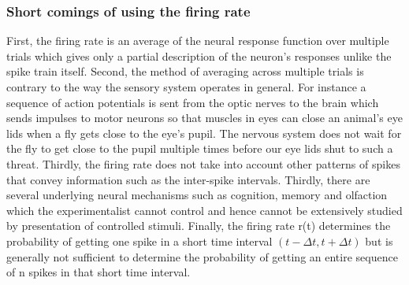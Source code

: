 \subsubsection{Short comings of using the firing rate}
First, the firing rate is an average of the neural response function over
multiple trials which gives only a partial description of the neuron's responses
unlike the spike train itself.
Second, the method of averaging across multiple trials is contrary to the way
the sensory system operates in general.
For instance a sequence of action potentials is sent from the optic nerves
to the brain which sends impulses to motor neurons so that muscles in eyes can close an animal's eye lids when a fly gets close to the eye's pupil.
The nervous system does not wait for the fly to get close to the pupil multiple
times before our eye lids shut to such a threat.
Thirdly, the firing rate does not take into account other patterns of spikes
that convey information such as the inter-spike intervals.
Thirdly, there are several underlying neural mechanisms such as cognition, memory
and olfaction which the experimentalist cannot control and hence cannot be extensively studied by presentation of controlled stimuli.
Finally, the firing rate r(t) determines the probability of getting one spike
in a short time interval $(t-\Delta t, t+\Delta t)$ but is generally not sufficient to determine the probability of getting an entire sequence of n spikes
in that short time interval.



